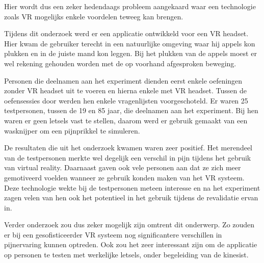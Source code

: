 Hier wordt dus een zeker hedendaags probleem aangekaard waar een technologie zoals VR mogelijks enkele voordelen teweeg kan brengen.

Tijdens dit onderzoek werd er een applicatie ontwikkeld voor een VR headset. Hier kwam de gebruiker terecht in een natuurlijke omgeving waar hij appels kon plukken en in de juiste mand kon leggen. Bij het plukken van de appels moest er wel rekening gehouden worden met de op voorhand afgesproken beweging.

Personen die deelnamen aan het experiment dienden eerst enkele oefeningen zonder VR headset uit te voeren en hierna enkele met VR headset. Tussen de oefensessies door werden hen enkele vragenlijsten voorgeschoteld. Er waren 25 testpersonen, tussen de 19 en 85 jaar, die deelnamen aan het experiment. Bij hen waren er geen letsels vast te stellen, daarom werd er gebruik gemaakt van een wasknijper om een pijnprikkel te simuleren.

De resultaten die uit het onderzoek kwamen waren zeer positief. Het merendeel van de testpersonen merkte wel degelijk een verschil in pijn tijdens het gebruik van virtual reality. Daarnaast gaven ook vele personen aan dat ze zich meer gemotiveerd voelden wanneer ze gebruik konden maken van het VR systeem. Deze technologie wekte bij de testpersonen meteen interesse en na het experiment zagen velen van hen ook het potentieel in het gebruik tijdens de revalidatie ervan in.

Verder onderzoek zou dus zeker mogelijk zijn omtrent dit onderwerp. Zo zouden er bij een gesofisticeerder VR systeem nog significantere verschillen in pijnervaring kunnen optreden. Ook zou het zeer interessant zijn om de applicatie op personen te testen met werkelijke letsels, onder begeleiding van de kinesist.

